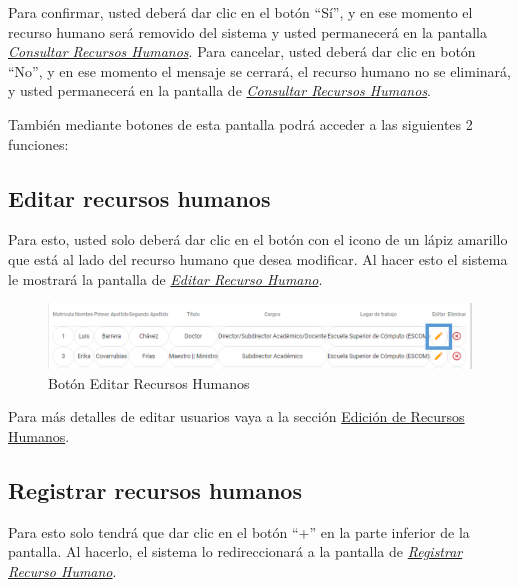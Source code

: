 \begin{enumerate}
\begin{figure}[H]
                \end{figure}

                Para confirmar, usted deberá dar clic en el botón “Sí”, y en ese momento el recurso humano será removido del sistema y usted permanecerá en la pantalla \hyperlink{consultarRH}{\textit{Consultar Recursos Humanos}}.
                Para cancelar, usted deberá dar clic en botón “No”, y en ese momento el mensaje se cerrará, el recurso humano no se eliminará, y usted permanecerá en la pantalla de \hyperlink{consultarRH}{\textit{Consultar Recursos Humanos}}.



        \end{enumerate}

        También mediante botones de esta pantalla podrá acceder a las siguientes 2 funciones:

        \subsection{Editar recursos humanos}

            Para esto, usted solo deberá dar clic en el botón con el icono de un lápiz amarillo que está al lado del recurso humano que desea modificar. Al hacer esto el sistema le mostrará la pantalla   de \hyperlink{editarRH}{\textit{Editar Recurso Humano}}.

            \begin{figure}[H]
                \centering
                \hypertarget{editar}{\includegraphics[width=0.7\linewidth]{images/SP1/BtnEditar}}
                \caption{Botón Editar Recursos Humanos}
                \label{editar}
            \end{figure}

            Para más detalles de editar usuarios vaya a la sección \hyperlink{editar-RH}{Edición de Recursos Humanos}.

        \subsection{Registrar recursos humanos}

            Para esto solo tendrá que dar clic en el botón “+” en la parte inferior de la pantalla. Al hacerlo, el sistema  lo redireccionará a la pantalla de \hyperlink{registrarRH}{\textit{Registrar Recurso Humano}}.

